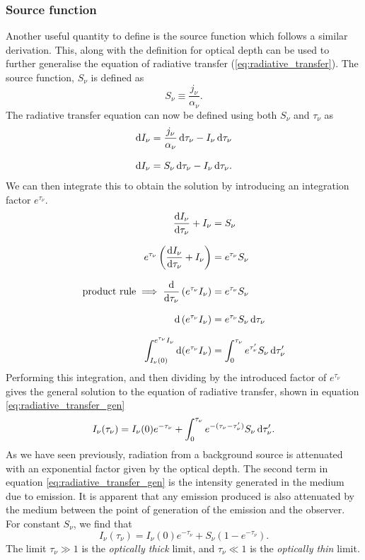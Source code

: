 \subsubsection{Source function}
Another useful quantity to define is the source function which follows a similar derivation. %
This, along with the definition for optical depth can be used to further generalise the equation of radiative transfer (\ref{eq:radiative_transfer}).
 The source function, $S_\nu$ is defined as
%
\begin{equation}
	S_\nu \equiv \frac{j_\nu}{\alpha_\nu}.
\end{equation}
%
The radiative transfer equation can now be defined using both $S_\nu$ and $\tau_\nu$ as
%
\begin{align*}
	\diff I_\nu &= \frac{j_\nu}{\alpha_\nu} \diff \tau_\nu - I_\nu \diff \tau_\nu
	\linedrop
	\diff I_\nu &= S_\nu \diff \tau_\nu - I_\nu \diff \tau_\nu.
\end{align*}
%
We can then integrate this to obtain the solution by introducing an integration factor $e^{\tau_\nu}$.
%
\begin{align*}
	\frac{\diff I_\nu}{\diff \tau_\nu} + I_\nu &= S_\nu
	\linedrop
	e^{\tau_\nu} \left( \frac{\diff I_\nu}{\diff \tau_\nu} + I_\nu \right) &= e^{\tau_\nu} S_\nu
	\linedrop
	\text{product rule} \implies 
	\frac{\diff}{\diff \tau_\nu} \left( e^{\tau_\nu} I_\nu \right) &= e^{\tau_\nu} S_\nu
	\linedrop
	\diff \left( e^{\tau_\nu} I_\nu \right) &= e^{\tau_\nu} S_\nu \diff \tau_\nu
	\linedrop
	\int_{I_\nu (0)}^{e^{\tau_\nu} I_\nu} \diff (e^{\tau_\nu} I_\nu) &= \int_{0}^{\tau_\nu} e^{\tau^{\prime}_\nu} S_\nu \diff \tau^\prime_\nu
\end{align*}
%
Performing this integration, and then dividing by the introduced factor of $e^{\tau_\nu}$ gives the general solution to the equation of radiative transfer, shown in equation \ref{eq:radiative_transfer_gen}
%
\begin{equation}
	I_\nu (\tau_\nu) = I_\nu (0) e^{-\tau_\nu} + \int_{0}^{\tau_\nu} e^{-(\tau_\nu - \tau^\prime_\nu)} S_\nu \mathop{}\!\mathrm{d} \tau^\prime_\nu.
	\label{eq:radiative_transfer_gen}
\end{equation}
%
As we have seen previously, radiation from a background source is attenuated with an exponential factor given by the optical depth.
 The second term in equation \ref{eq:radiative_transfer_gen} is the intensity generated in the medium due to emission.
 It is apparent that any emission produced is also attenuated by the medium between the point of generation of the emission and the observer.
 For constant $S_\nu$, we find that
%
\begin{equation}
	I_\nu (\tau_\nu) = I_\nu (0) e^{-\tau_\nu} + S_\nu (1 - e^{-\tau_\nu}).
\end{equation}
%
The limit $\tau_\nu \gg 1$ is the \emph{optically thick} limit, and $\tau_\nu \ll 1$ is the \emph{optically thin} limit.
%
%
%
